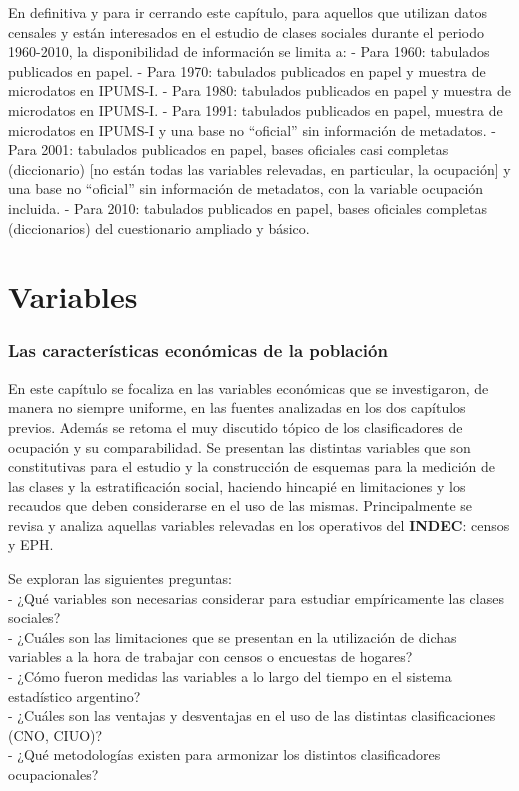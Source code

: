 \documentclass[
]{article}
\begin{document}
En definitiva y para ir cerrando este capítulo, para aquellos que utilizan datos censales y están interesados en el estudio de clases sociales durante el periodo 1960-2010, la disponibilidad de información se limita a: - Para 1960: tabulados publicados en papel. - Para 1970: tabulados publicados en papel y muestra de microdatos en IPUMS-I. - Para 1980: tabulados publicados en papel y muestra de microdatos en IPUMS-I. - Para 1991: tabulados publicados en papel, muestra de microdatos en IPUMS-I y una base no ``oficial'' sin información de metadatos. - Para 2001: tabulados publicados en papel, bases oficiales casi completas (diccionario) {[}no están todas las variables relevadas, en particular, la ocupación{]} y una base no ``oficial'' sin información de metadatos, con la variable ocupación incluida. - Para 2010: tabulados publicados en papel, bases oficiales completas (diccionarios) del cuestionario ampliado y básico.

\hypertarget{part-variables}{%
\part{Variables}\label{part-variables}}

\hypertarget{ocupacion}{%
\section{Las características económicas de la población}\label{ocupacion}}

En este capítulo se focaliza en las variables económicas que se investigaron, de manera no siempre uniforme, en las fuentes analizadas en los dos capítulos previos. Además se retoma el muy discutido tópico de los clasificadores de ocupación y su comparabilidad. Se presentan las distintas variables que son constitutivas para el estudio y la construcción de esquemas para la medición de las clases y la estratificación social, haciendo hincapié en limitaciones y los recaudos que deben considerarse en el uso de las mismas. Principalmente se revisa y analiza aquellas variables relevadas en los operativos del \textbf{INDEC}: censos y EPH.

Se exploran las siguientes preguntas:\\
- ¿Qué variables son necesarias considerar para estudiar empíricamente las clases sociales?\\
- ¿Cuáles son las limitaciones que se presentan en la utilización de dichas variables a la hora de trabajar con censos o encuestas de hogares?\\
- ¿Cómo fueron medidas las variables a lo largo del tiempo en el sistema estadístico argentino?\\
- ¿Cuáles son las ventajas y desventajas en el uso de las distintas clasificaciones (CNO, CIUO)?\\
- ¿Qué metodologías existen para armonizar los distintos clasificadores ocupacionales?
\end{document}
